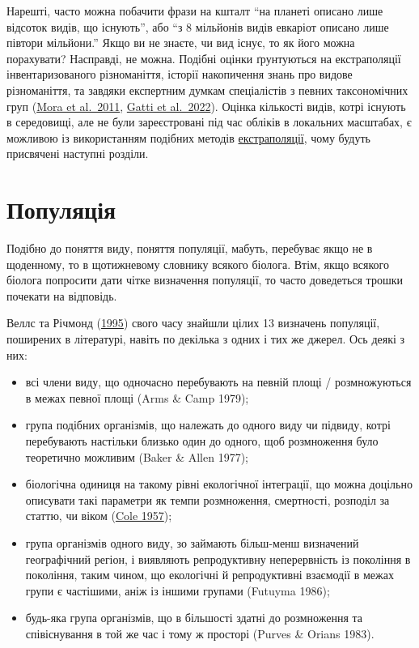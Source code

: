 \documentclass[
  11pt,
]{book}
\begin{document}
Нарешті, часто можна побачити фрази на кшталт ``на планеті описано лише відсоток видів, що існують'', або ``з 8 мільйонів видів евкаріот описано лише півтори мільйони.'' Якщо ви не знаєте, чи вид існує, то як його можна порахувати? Насправді, не можна. Подібні оцінки ґрунтуються на екстраполяції інвентаризованого різноманіття, історії накопичення знань про видове різноманіття, та завдяки експертним думкам спеціалістів з певних таксономічних груп (\href{https://doi.org/10.1371/journal.pbio.1001127}{Mora et al.~2011}, \href{https://doi.org/10.1073/pnas.2115329119}{Gatti et al.~2022}). Оцінка кількості видів, котрі існують в середовищі, але не були зареєстровані під час обліків в локальних масштабах, є можливою із використанням подібних методів \hyperref[rarefaction]{екстраполяції}, чому будуть присвячені наступні розділи.

\section{Популяція}\label{population}

Подібно до поняття виду, поняття популяції, мабуть, перебуває якщо не в щоденному, то в щотижневому словнику всякого біолога. Втім, якщо всякого біолога попросити дати чітке визначення популяції, то часто доведеться трошки почекати на відповідь.

Веллс та Річмонд (\href{https://www.researchgate.net/publication/281243816}{1995}) свого часу знайшли цілих 13 визначень популяції, поширених в літературі, навіть по декілька з одних і тих же джерел. Ось деякі з них:

\begin{itemize}
\item
  всі члени виду, що одночасно перебувають на певній площі / розмножуються в межах певної площі (Arms \& Camp 1979);
\item
  група подібних організмів, що належать до одного виду чи підвиду, котрі перебувають настільки близько один до одного, щоб розмноження було теоретично можливим (Baker \& Allen 1977);
\item
  біологічна одиниця на такому рівні екологічної інтеграції, що можна доцільно описувати такі параметри як темпи розмноження, смертності, розподіл за статтю, чи віком (\href{https://doi.org/10.1101/sqb.1957.022.01.004}{Cole 1957});
\item
  група організмів одного виду, зо займають більш-менш визначений географічний регіон, і виявляють репродуктивну неперервність із покоління в покоління, таким чином, що екологічні й репродуктивні взаємодії в межах групи є частішими, аніж із іншими групами (Futuyma 1986);
\item
  будь-яка група організмів, що в більшості здатні до розмноження та співіснування в той же час і тому ж просторі (Purves \& Orians 1983).
\end{itemize}
\end{document}
